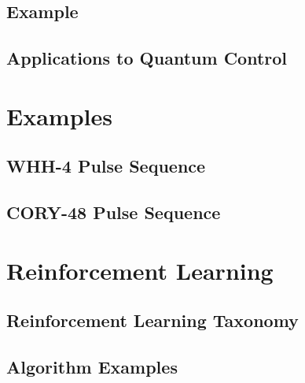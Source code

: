 




\subsection{Example}




\subsection{Applications to Quantum Control}


\lipsum[1-5]


\section{Examples}

\lipsum[1]

\subsection{WHH-4 Pulse Sequence}

\lipsum[1-3]

\subsection{CORY-48 Pulse Sequence}

\lipsum[1-3]



\section{Reinforcement Learning}

\lipsum[1-3]

\subsection{Reinforcement Learning Taxonomy}

\lipsum[1-5]

\subsection{Algorithm Examples}


\lipsum[1-5]
